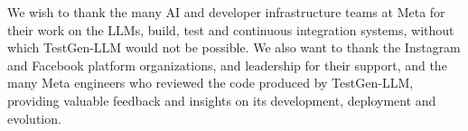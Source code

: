 \documentclass[sigconf,screen]{acmart}
\begin{document}
\bigskip

\small
We wish to thank the many AI and developer infrastructure teams at Meta for their work on the LLMs, build, test and continuous integration systems, without which TestGen-LLM would not be possible.
We also want to thank the Instagram and Facebook platform organizations, and leadership for their support, and the many Meta engineers who reviewed the code produced by TestGen-LLM, providing valuable feedback and insights on its development, deployment and evolution. 
\normalsize

\newpage
\balance

%


\end{document}

